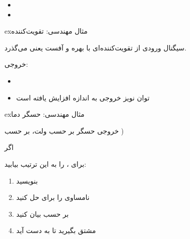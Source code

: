 \begin{itemize}
\tightlist
\item
\item
\end{itemize}

\begin{PSbox}[unbreakable]{ex}{مثال مهندسی: تقویت‌کننده}

سیگنال ورودی  از تقویت‌کننده‌ای با بهره  و آفست  یعنی  می‌گذرد.

خروجی: 

\begin{itemize}
\tightlist
\item
\item
  توان نویز خروجی به اندازه  افزایش یافته است
\end{itemize}

\end{PSbox}

\begin{PSbox}[unbreakable]{ex}{مثال مهندسی: حسگر دما}

خروجی حسگر  بر حسب ولت،  بر حسب )

اگر 

\end{PSbox}



برای ،  را به این ترتیب بیابید:

\begin{enumerate}
\def\labelenumi{\arabic{enumi}.}
\tightlist
\item
  بنویسید 
\item
  نامساوی را برای  حل کنید
\item
  بر حسب  بیان کنید
\item
  مشتق بگیرید تا  به دست آید
\end{enumerate}

